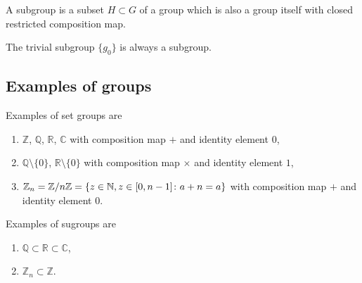     \begin{definition}[Subgroup]
        A subgroup is a subset $H \subset G$ of a group which is also a group itself with closed restricted composition map.
    \end{definition}
    \noindent The trivial subgroup $\{g_0\}$ is always a subgroup.

\subsection{Examples of groups}

    \begin{example}
        Examples of set groups are
        \begin{enumerate}
            \item $\mathbb Z$, $\mathbb Q$, $\mathbb R$, $\mathbb C$ with composition map $+$ and identity element $0$,
            \item $\mathbb Q\setminus\{0\}$, $\mathbb R\setminus\{0\}$ with composition map $\times$ and identity element $1$,
            \item $\mathbb Z_n = \mathbb Z / n \mathbb Z =  \{z \in \mathbb N, z \in [0, n-1]\colon a+n = a\}$ with composition map $+$ and identity element $0$.
        \end{enumerate}
    \end{example}

    \begin{example}[Subgroups]
        Examples of sugroups are
        \begin{enumerate}
            \item $\mathbb Q \subset \mathbb R \subset \mathbb C$,
            \item $\mathbb Z_n \subset \mathbb Z$.
        \end{enumerate}
    \end{example}

